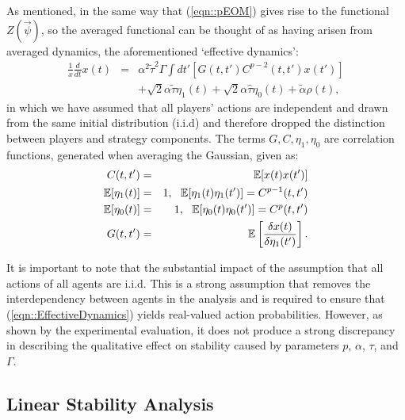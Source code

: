 \documentclass{article}
\newcommand{\talpha}{\tilde{\alpha}}
\newcommand{\ttau}{\tilde{\tau}}
\newcommand{\htau}{\hat{\tau}}
\begin{document}
As mentioned, in the same way that (\ref{eqn::pEOM}) gives rise to the functional $Z(\Vec{\psi})$, so the averaged functional can be thought of as having arisen from averaged dynamics, the aforementioned `effective dynamics':
%
\begin{eqnarray}
    \label{eqn::EffectiveDynamics}
            \frac{1}{x} \frac{d}{dt} x(t) & = & \alpha^2 \ttau^2 \Gamma \int dt' \left [G(t, t')C^{p - 2}(t, t') x(t') \right ] \nonumber \\ && + \sqrt{2} \alpha \ttau \eta_1(t) + \sqrt{2} \alpha \htau \eta_0(t) + \talpha \rho(t), 
\end{eqnarray}
%
in which we have assumed that all players' actions are independent and drawn from the same initial distribution (i.i.d)
and therefore dropped the distinction between players and strategy components. The terms $G, C, \eta_1, \eta_0$ are correlation functions, generated when averaging the Gaussian, given as: 
%
\begin{eqnarray*}
        C(t, t') & = & \mathbb{E}[x(t) x(t')] \\
        \mathbb{E}[\eta_1(t)] & = & 1, \text{ \space } \mathbb{E}[\eta_1(t) \eta_1(t')]  =  C^{p-1}(t, t') \\
        \mathbb{E}[\eta_0(t)] & = & 1, \text{ \space } \mathbb{E}[\eta_0(t) \eta_0(t')] = C^{p}(t, t') \\
        G(t, t') & = & \mathbb{E}\left [ \frac{\delta x(t)}{ \delta \eta_1(t')} \right].
\end{eqnarray*}

It is important to note that the substantial impact of the assumption that all
actions of all agents are i.i.d. This is a strong assumption that removes the interdependency
between agents in the analysis and is required to ensure that (\ref{eqn::EffectiveDynamics}) yields real-valued action probabilities. However, as shown by the experimental
evaluation, it does not produce a strong discrepancy in describing the
qualitative effect on stability caused by parameters $p$, $\alpha$, $\tau$, and $\Gamma$.

\subsection{Linear Stability Analysis}
\label{sec::stability}
\end{document}
